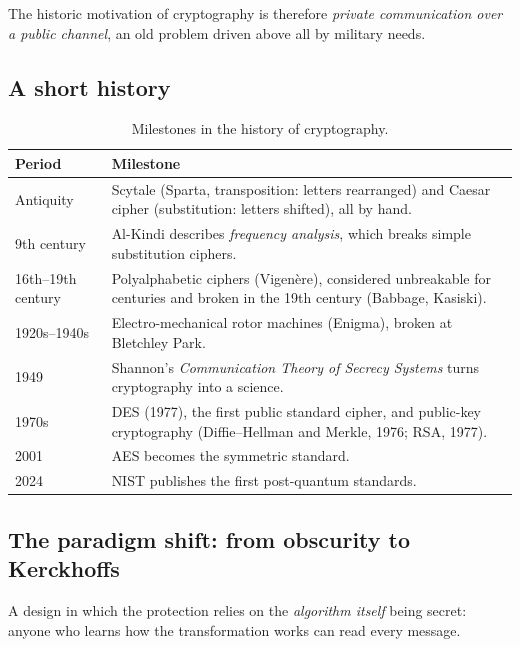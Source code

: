 The historic motivation of cryptography is therefore \emph{private communication over a public channel}, an old problem driven above all by military needs.

\subsection{A short history}

\begin{table}[H]
\centering
\caption{Milestones in the history of cryptography.}
\label{tab:crypto-history}
\begin{tabularx}{\textwidth}{@{}l X@{}}
\toprule
Period & Milestone \\
\midrule
Antiquity & Scytale (Sparta, transposition: letters rearranged) and Caesar cipher (substitution: letters shifted), all by hand. \\
9th century & Al-Kindi describes \emph{frequency analysis}, which breaks simple substitution ciphers. \\
16th--19th century & Polyalphabetic ciphers (Vigenère), considered unbreakable for centuries and broken in the 19th century (Babbage, Kasiski). \\
1920s--1940s & Electro-mechanical rotor machines (Enigma), broken at Bletchley Park. \\
1949 & Shannon's \emph{Communication Theory of Secrecy Systems} \cite{shannon1949} turns cryptography into a science. \\
1970s & DES (1977), the first public standard cipher, and public-key cryptography (Diffie--Hellman and Merkle, 1976; RSA, 1977). \\
2001 & AES becomes the symmetric standard. \\
2024 & NIST publishes the first post-quantum standards. \\
\bottomrule
\end{tabularx}
\end{table}

\subsection{The paradigm shift: from obscurity to Kerckhoffs}

\begin{definition}
A design in which the protection relies on the \emph{algorithm itself} being secret: anyone who learns how the transformation works can read every message.
\end{definition}

